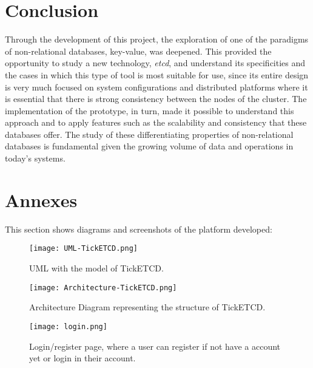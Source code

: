 \documentclass[screen,review]{acmart}
\begin{document}
\section{Conclusion}
Through the development of this project, the exploration of one of the paradigms of non-relational databases, key-value, was deepened. This provided the opportunity to study a new technology, \textit{etcd}, and understand its specificities and the cases in which this type of tool is most suitable for use, since its entire design is very much focused on system configurations and distributed platforms where it is essential that there is strong consistency between the nodes of the cluster. The implementation of the prototype, in turn, made it possible to understand this approach and to apply features such as the scalability and consistency that these databases offer. The study of these differentiating properties of non-relational databases is fundamental given the growing volume of data and operations in today's systems.

\section{Annexes}

This section shows diagrams and screenshots of the platform developed:

\hspace{1cm}

    \begin{figure}[h!]
        \centering
        \texttt{[image: UML-TickETCD.png]}
        \caption{UML with the model of TickETCD.}
        \label{fig:UML}
    \end{figure}

\hspace{1cm}

\hspace{1cm}

    \begin{figure}[h!]
        \centering
        \texttt{[image: Architecture-TickETCD.png]}
        \caption{Architecture Diagram representing the structure of TickETCD.}
        \label{fig:Architecture}
    \end{figure}

\hspace{1cm}

\hspace{1cm}

    \begin{figure}[h!]
        \centering
        \texttt{[image: login.png]}
        \caption{Login/register page, where a user can register if not have a account yet or login in their account.}
        \label{fig:login}
    \end{figure}
\end{document}
